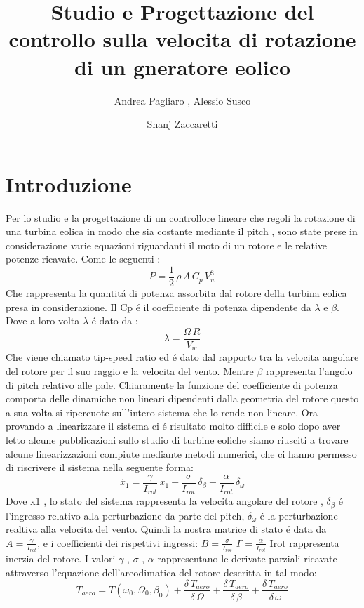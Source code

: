 \documentclass[a4paper,13pt]{article}
\begin{document}
\author{Andrea Pagliaro , Alessio Susco \and Shanj Zaccaretti}
\title{Studio e Progettazione del controllo sulla velocita di rotazione di un gneratore eolico}
\maketitle
\section{Introduzione}
Per lo studio e la progettazione di un controllore lineare che regoli la rotazione di una turbina eolica in modo che sia costante mediante il pitch , sono state prese in considerazione varie equazioni riguardanti il moto di un rotore e le relative potenze ricavate.
Come le seguenti :
\begin{equation}
P=\frac{1}{2}\,\rho\,A\,C_p\,V_w^3
\end{equation}
Che rappresenta la quantit\'a di potenza assorbita dal rotore della turbina eolica presa in considerazione.
Il Cp \'e il coefficiente di potenza dipendente da $\lambda$ e $\beta$.
Dove a loro volta $\lambda$ \'e dato da :
\begin{equation}
\lambda=\frac{\Omega\,R}{V_w}
\end{equation}
Che viene chiamato tip-speed ratio ed \'e dato dal rapporto tra la velocita angolare
del rotore per il suo raggio e la velocita del vento.
Mentre $\beta$ rappresenta l'angolo di pitch relativo alle pale.
Chiaramente la funzione del coefficiente di potenza comporta delle dinamiche non 
lineari dipendenti dalla geometria del rotore questo a sua volta si ripercuote sull'intero sistema che lo rende non lineare.  
Ora provando a linearizzare il sistema ci \'e risultato molto difficile e solo dopo aver letto alcune pubblicazioni sullo studio di turbine eoliche siamo riusciti a trovare alcune linearizzazioni compiute mediante metodi numerici, che ci hanno permesso di riscrivere il sistema nella seguente forma:
\begin{equation}
\dot{x_1}=\frac{\gamma}{I_{rot}}\,x_1+\frac{\sigma}{I_{rot}}\,\delta_\beta+\frac{\alpha}{I_{rot}}\,\delta_\omega
\end{equation}
Dove x1 , lo stato del sistema rappresenta la velocita angolare del rotore ,
$\delta_\beta$ \'e l'ingresso relativo alla perturbazione da parte del pitch,
$\delta_\omega$ \'e la perturbazione realtiva alla velocita del vento.
Quindi la nostra matrice di stato \'e data da $A=\frac{\gamma}{I_{rot}}$,
e i coefficienti dei rispettivi ingressi:
$B=\frac{\sigma}{I_{rot}}$
$\Gamma=\frac{\alpha}{I_{rot}}$
Irot rappresenta inerzia del rotore.
I valori $\gamma$ , $\sigma$ , $\alpha$ rappresentano le derivate parziali ricavate attraverso 
l'equazione dell'areodimatica del rotore descritta in tal modo:
\begin{equation}
T_{aero}=T(\omega_0,\Omega_0,\beta_0)+\frac{\delta \, T_{aero}}{\delta \, \Omega}+
\frac{\delta \, T_{aero}}{\delta \, \beta}+\frac{\delta \, T_{aero}}{\delta \, \omega}
\end{equation} 

 
\end{document}
